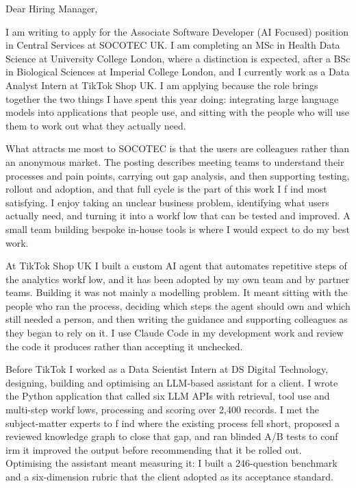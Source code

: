 \documentclass[letterpaper,11pt]{article}
\begin{document}
Dear Hiring Manager,

I am writing to apply for the Associate Software Developer (AI Focused) position in Central Services at SOCOTEC UK. I am completing an MSc in Health Data Science at University College London, where a distinction is expected, after a BSc in Biological Sciences at Imperial College London, and I currently work as a Data Analyst Intern at TikTok Shop UK. I am applying because the role brings together the two things I have spent this year doing: integrating large language models into applications that people use, and sitting with the people who will use them to work out what they actually need.

What attracts me most to SOCOTEC is that the users are colleagues rather than an anonymous market. The posting describes meeting teams to understand their processes and pain points, carrying out gap analysis, and then supporting testing, rollout and adoption, and that full cycle is the part of this work I f\kern0pt ind most satisfying. I enjoy taking an unclear business problem, identifying what users actually need, and turning it into a workf\kern0pt low that can be tested and improved. A small team building bespoke in-house tools is where I would expect to do my best work.

At TikTok Shop UK I built a custom AI agent that automates repetitive steps of the analytics workf\kern0pt low, and it has been adopted by my own team and by partner teams. Building it was not mainly a modelling problem. It meant sitting with the people who ran the process, deciding which steps the agent should own and which still needed a person, and then writing the guidance and supporting colleagues as they began to rely on it. I use Claude Code in my development work and review the code it produces rather than accepting it unchecked.

Before TikTok I worked as a Data Scientist Intern at DS Digital Technology, designing, building and optimising an LLM-based assistant for a client. I wrote the Python application that called six LLM APIs with retrieval, tool use and multi-step workf\kern0pt lows, processing and scoring over 2,400 records. I met the subject-matter experts to f\kern0pt ind where the existing process fell short, proposed a reviewed knowledge graph to close that gap, and ran blinded A/B tests to conf\kern0pt irm it improved the output before recommending that it be rolled out. Optimising the assistant meant measuring it: I built a 246-question benchmark and a six-dimension rubric that the client adopted as its acceptance standard.
\end{document}
